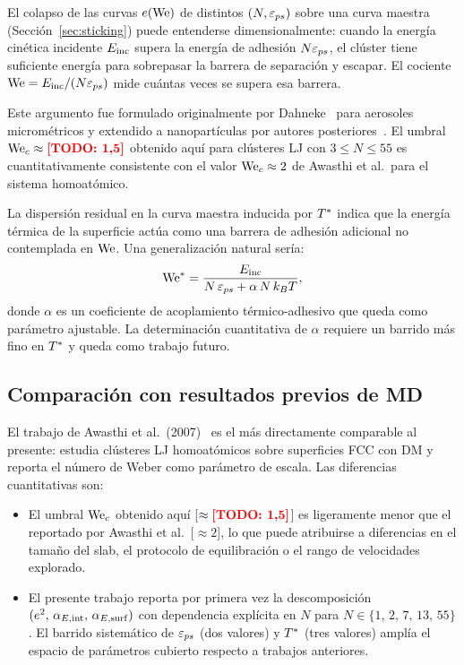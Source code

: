 El colapso de las curvas $e(\mathrm{We})$ de distintos $(N, \varepsilon_{ps})$ sobre una
curva maestra (Sección~\ref{sec:sticking}) puede entenderse dimensionalmente:
cuando la energía cinética incidente $E_{\mathrm{inc}}$ supera la energía de adhesión
$N\varepsilon_{ps}$, el clúster tiene suficiente energía para sobrepasar la barrera
de separación y escapar. El cociente $\mathrm{We} = E_{\mathrm{inc}}/(N\varepsilon_{ps})$ mide cuántas
veces se supera esa barrera.

Este argumento fue formulado originalmente por Dahneke~\cite{dahneke1975} para
aerosoles micrométricos y extendido a nanopartículas por autores
posteriores~\cite{awasthi2007}. El umbral $\mathrm{We}_c \approx \textcolor{red}{\textbf{[TODO: 1{,}5]}}$ obtenido
aquí para clústeres LJ con $3 \leq N \leq 55$ es cuantitativamente consistente
con el valor $\mathrm{We}_c \approx 2$ de Awasthi et al.\ para el sistema homoatómico.

La dispersión residual en la curva maestra inducida por $T^{*}$ indica que
la energía térmica de la superficie actúa como una barrera de adhesión
adicional no contemplada en $\mathrm{We}$. Una generalización natural sería:
\begin{equation}
    \mathrm{We}^* = \frac{E_{\mathrm{inc}}}{N\,\varepsilon_{ps} + \alpha\,N\,k_B T},
    \label{eq:weber_extendido}
\end{equation}
donde $\alpha$ es un coeficiente de acoplamiento térmico-adhesivo que queda
como parámetro ajustable. La determinación cuantitativa de $\alpha$ requiere
un barrido más fino en $T^{*}$ y queda como trabajo futuro.

\subsection{Comparación con resultados previos de MD}
\label{sec:comparacion}

El trabajo de Awasthi et al.\ (2007)~\cite{awasthi2007} es el más directamente
comparable al presente: estudia clústeres LJ homoatómicos sobre superficies FCC
con DM y reporta el número de Weber como parámetro de escala. Las diferencias
cuantitativas son:

\begin{itemize}
    \item El umbral $\mathrm{We}_c$ obtenido aquí [$\approx\textcolor{red}{\textbf{[TODO: 1{,}5]}}$] es ligeramente
    menor que el reportado por Awasthi et al.\ [$\approx 2$], lo que puede
    atribuirse a diferencias en el tamaño del slab, el protocolo de
    equilibración o el rango de velocidades explorado.

    \item El presente trabajo reporta por primera vez la descomposición
    $(e^2,\, \alpha_{E,\mathrm{int}},\, \alpha_{E,\mathrm{surf}})$ con dependencia explícita en $N$
    para $N \in \{1,\, 2,\, 7,\, 13,\, 55\}$. El barrido sistemático de
    $\varepsilon_{ps}$ (dos valores) y $T^{*}$ (tres valores) amplía el espacio
    de parámetros cubierto respecto a trabajos anteriores.
\end{itemize}

